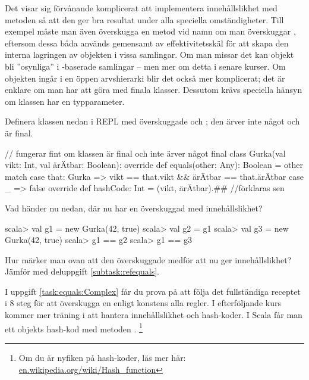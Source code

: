 \begin{Background}
Det visar sig förvånande komplicerat att implementera innehållslikhet med metoden  så att den ger bra resultat under alla speciella omständigheter. Till exempel måste man även överskugga en metod vid namn  om man överskuggar , eftersom dessa båda används gemensamt av effektivitetsskäl för att skapa den interna lagringen av objekten i vissa samlingar. Om man missar det kan objekt bli ''osynliga'' i -baserade samlingar -- men mer om detta i senare kurser. Om objekten ingår i en öppen arvshierarki blir det också mer komplicerat; det är enklare om man har att göra med finala klasser. Dessutom krävs speciella hänsyn om klassen har en typparameter.
\end{Background}

\noindent Definera klassen nedan i REPL med överskuggade  och ; den ärver inte något och är final.

\begin{Code}
// fungerar fint om klassen är final och inte ärver något
final class Gurka(val vikt: Int, val ärÄtbar: Boolean):
  override def equals(other: Any): Boolean = other match
    case that: Gurka => vikt == that.vikt && ärÄtbar == that.ärÄtbar
    case _ => false
  override def hashCode: Int = (vikt, ärÄtbar).## //förklaras sen
\end{Code}
\Subtask Vad händer nu nedan, där  nu har en överskuggad  med innehållslikhet?
\begin{REPL}
scala> val g1 = new Gurka(42, true)
scala> val g2 = g1
scala> val g3 = new Gurka(42, true)
scala> g1 == g2
scala> g1 == g3
\end{REPL}
\Subtask Hur märker man ovan att den överskuggade  medför att \code{==} nu ger innehållslikhet? Jämför med deluppgift \ref{subtask:refequals}.

I uppgift \ref{task:equals:Complex} får du prova på att följa det fullständiga receptet i 8 steg för att överskugga en  enligt konstens alla regler. I efterföljande kurs kommer mer träning i att hantera innehållslikhet och hash-koder. I Scala får man ett objekts hash-kod med metoden \code{##}.%
\footnote{Om du är nyfiken på hash-koder, läs mer här:
\href{https://en.wikipedia.org/wiki/Hash_function}
{en.wikipedia.org/wiki/Hash\_function}
}


\SOLUTION


\TaskSolved \what


